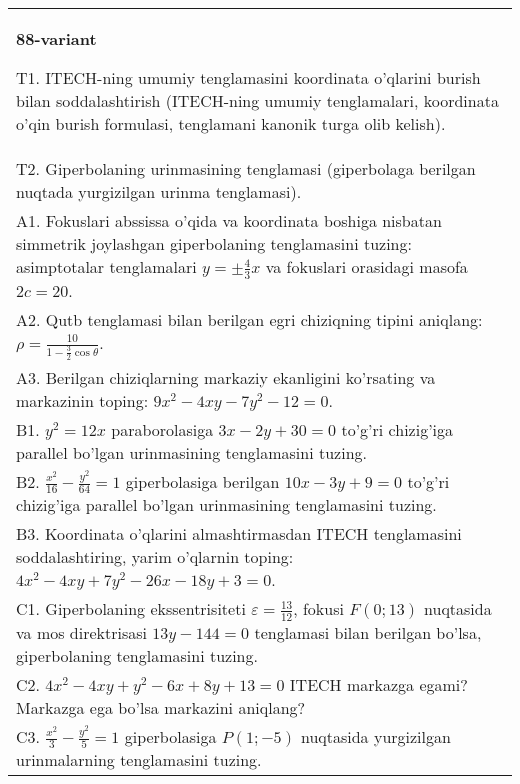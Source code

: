 \documentclass{article}
\begin{document}
\begin{tabular}{m{17cm}}
\textbf{88-variant}
\newline

T1. ITECH-ning umumiy tenglamasini koordinata o'qlarini burish bilan soddalashtirish (ITECH-ning umumiy tenglamalari, koordinata o'qin burish formulasi, tenglamani kanonik turga olib kelish).\\

T2. Giperbolaning urinmasining tenglamasi (giperbolaga berilgan nuqtada yurgizilgan urinma tenglamasi).\\

A1. Fokuslari abssissa o'qida va koordinata boshiga nisbatan simmetrik joylashgan giperbolaning tenglamasini tuzing: asimptotalar tenglamalari $y=\pm \frac{4}{3}x$ va fokuslari orasidagi masofa $2c=20$.\\

A2. Qutb tenglamasi bilan berilgan egri chiziqning tipini aniqlang: $\rho=\frac{10}{1-\frac{3}{2}\cos\theta}$.\\

A3. Berilgan chiziqlarning markaziy ekanligini ko'rsating va markazinin toping: $9x^{2}-4xy-7y^{2}-12=0$.\\

B1. $y^{2} = 12x$ paraborolasiga $3x - 2y + 30 = 0$ to'g'ri chizig'iga parallel bo'lgan urinmasining tenglamasini tuzing.  \\

B2. $\frac{x^{2}}{16} - \frac{y^{2}}{64} = 1$ giperbolasiga berilgan $10x - 3y + 9 = 0$ to'g'ri chizig'iga parallel bo'lgan urinmasining tenglamasini tuzing.  \\

B3. Koordinata o'qlarini almashtirmasdan ITECH tenglamasini soddalashtiring, yarim o'qlarnin toping: $4x^{2} - 4xy + 7y^{2} - 26x - 18y + 3 = 0$.\\

C1. Giperbolaning ekssentrisiteti $\varepsilon = \frac{13}{12}$, fokusi $F(0;13)$ nuqtasida va mos direktrisasi $13y - 144 = 0$ tenglamasi bilan berilgan bo'lsa, giperbolaning tenglamasini tuzing.  \\

C2. $4x^{2} - 4xy + y^{2} - 6x + 8y + 13 = 0$ ITECH markazga egami? Markazga ega bo'lsa markazini aniqlang?  \\

C3. $\frac{x^{2}}{3} - \frac{y^{2}}{5} = 1$ giperbolasiga $P(1; - 5)$ nuqtasida yurgizilgan urinmalarning tenglamasini tuzing.\\

\end{tabular}
\vspace{1cm}
\end{document}
